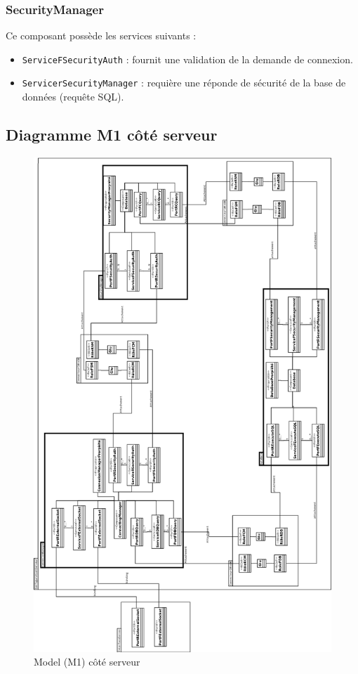 \subsubsection{SecurityManager}
Ce composant possède les services suivants : 
\begin{itemize}
\item 
  \verb+ServiceFSecurityAuth+ : fournit une validation de la demande de connexion.
\item 
  \verb+ServicerSecurityManager+ :  requière une réponde de sécurité de la base de données (requête SQL).
\end{itemize}

\subsection{Diagramme M1 côté serveur}
\pagestyle{fancy}
\clearpage
\pagestyle{empty}
{
\begin{figure}[htb]
  \centering
  \includegraphics[scale=0.20]{img/M1}
  \caption{Model (M1) côté serveur}
  \label{fig:M1}
\end{figure}
}
\clearpage

